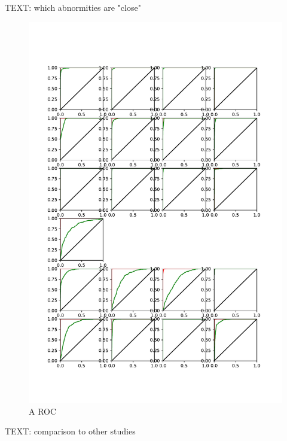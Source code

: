 \documentclass{article}
\begin{document}
	TEXT: which abnormities are "close"
	
	\begin{figure}[htbp]
		\centering
		\includegraphics[width=\linewidth]{Figs/abnormity_ROC.pdf}
		\caption{A ROC}
		\vspace{0.3cm}
		\label{fig:A_ROC}
	\end{figure}
	
	TEXT: comparison to other studies
	
\end{document}
